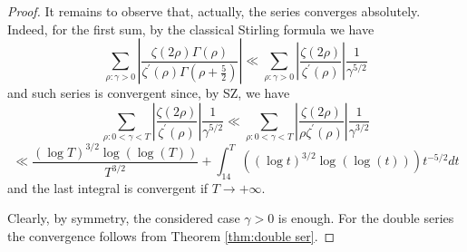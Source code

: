 \documentclass[10pt,a4paper]{amsart}
\begin{document}
\begin{proof}
It remains to observe that, actually, the series converges absolutely.
Indeed, for the first sum, by the classical Stirling formula we
have
\[
\sum_{\rho:\gamma>0}\left|\frac{\zeta\left(2\rho\right)\Gamma\left(\rho\right)}{\zeta^{\prime}\left(\rho\right)\Gamma\left(\rho+\frac{5}{2}\right)}\right|\ll\sum_{\rho:\gamma>0}\left|\frac{\zeta\left(2\rho\right)}{\zeta^{\prime}\left(\rho\right)}\right|\frac{1}{\gamma^{5/2}}
\]
and such series is convergent since, by SZ, we have
\[
\sum_{\rho:0<\gamma<T}\left|\frac{\zeta\left(2\rho\right)}{\zeta^{\prime}\left(\rho\right)}\right|\frac{1}{\gamma^{5/2}}\ll\sum_{\rho:0<\gamma<T}\left|\frac{\zeta\left(2\rho\right)}{\rho\zeta^{\prime}\left(\rho\right)}\right|\frac{1}{\gamma^{3/2}}
\]
\[
\ll\frac{\left(\log T\right)^{3/2}\log\left(\log\left(T\right)\right)}{T^{3/2}}+\int_{14}^{T}\left(\left(\log t\right)^{3/2}\log\left(\log\left(t\right)\right)\right)t^{-5/2}dt
\]
and the last integral is convergent if $T\rightarrow+\infty$. 

Clearly, by symmetry, the considered case $\gamma>0$ is enough. For
the double series the convergence follows from Theorem \ref{thm:double ser}.
\end{proof}
\end{document}
